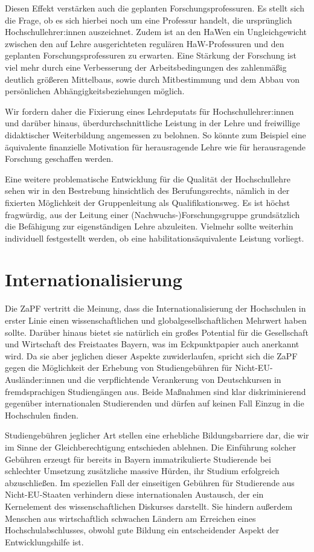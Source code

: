 \documentclass[a4paper]{scrartcl}
\begin{document}
Diesen Effekt verstärken auch die geplanten Forschungsprofessuren. Es stellt sich die Frage, ob es sich hierbei noch um eine Professur handelt, die ursprünglich Hochschullehrer:innen auszeichnet. Zudem ist an den HaWen ein Ungleichgewicht zwischen den auf Lehre ausgerichteten regulären HaW-Professuren und den geplanten Forschungsprofessuren zu erwarten. Eine Stärkung der Forschung ist viel mehr durch eine Verbesserung der Arbeitsbedingungen des zahlenmäßig deutlich größeren Mittelbaus, sowie durch Mitbestimmung und dem Abbau von persönlichen Abhängigkeitsbeziehungen möglich.

Wir fordern daher die Fixierung eines Lehrdeputats für Hochschullehrer:innen und darüber hinaus, überdurchschnittliche Leistung in der Lehre und freiwillige didaktischer Weiterbildung angemessen zu belohnen. So könnte zum Beispiel eine äquivalente finanzielle Motivation für herausragende Lehre wie für herausragende Forschung geschaffen werden.

Eine weitere problematische Entwicklung für die Qualität der Hochschullehre sehen wir in den Bestrebung hinsichtlich des Berufungsrechts, nämlich in der fixierten Möglichkeit der Gruppenleitung als Qualifikationsweg. Es ist höchst fragwürdig, aus der Leitung einer (Nachwuchs-)Forschungsgruppe grundsätzlich die Befähigung zur eigenständigen Lehre abzuleiten. Vielmehr sollte weiterhin individuell festgestellt werden, ob eine habilitationsäquivalente Leistung vorliegt.

\section{Internationalisierung}

Die ZaPF vertritt die Meinung, dass die Internationalisierung der Hochschulen in erster Linie einen wissenschaftlichen und globalgesellschaftlichen Mehrwert haben sollte. Darüber hinaus bietet sie natürlich ein großes Potential für die Gesellschaft und Wirtschaft des Freistaates Bayern, was im Eckpunktpapier auch anerkannt wird. Da sie aber jeglichen dieser Aspekte zuwiderlaufen, spricht sich die ZaPF gegen die Möglichkeit der Erhebung von Studiengebühren für Nicht-EU-Ausländer:innen und die verpflichtende Verankerung von Deutschkursen in fremdsprachigen Studiengängen aus. Beide Maßnahmen sind klar diskriminierend gegenüber internationalen Studierenden und dürfen auf keinen Fall Einzug in die Hochschulen finden.

Studiengebühren jeglicher Art stellen eine erhebliche Bildungsbarriere dar, die wir im Sinne der Gleichberechtigung entschieden ablehnen. Die Einführung solcher Gebühren erzeugt für bereits in Bayern immatrikulierte Studierende bei schlechter Umsetzung zusätzliche massive Hürden, ihr Studium erfolgreich abzuschließen. Im speziellen Fall der einseitigen Gebühren für Studierende aus Nicht-EU-Staaten verhindern diese internationalen Austausch, der ein Kernelement des wissenschaftlichen Diskurses darstellt. Sie hindern außerdem Menschen aus wirtschaftlich schwachen Ländern am Erreichen eines Hochschulabschlusses, obwohl gute Bildung ein entscheidender Aspekt der Entwicklungshilfe ist.
\end{document}
